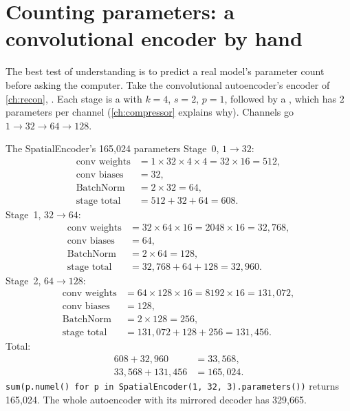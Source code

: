 \section{Counting parameters: a convolutional encoder by hand}\label{sec:shapes:count}

The best test of understanding is to predict a real model's parameter count before asking the
computer. Take the convolutional autoencoder's encoder of \cref{ch:recon},
. Each stage is a
 with $k=4$, $s=2$, $p=1$, followed by a , which has $2$ parameters per
channel (\cref{ch:compressor} explains why). Channels go $1\to32\to64\to128$.

\begin{worked}[label={we:shapes:spatialcount}]{The SpatialEncoder's 165,024 parameters}
Stage~0, $1\to32$:
\begin{align*}
\text{conv weights} &= 1\times32\times4\times4 = 32\times16 = 512,\\
\text{conv biases} &= 32,\\
\text{BatchNorm} &= 2\times32 = 64,\\
\text{stage total} &= 512 + 32 + 64 = 608.
\end{align*}
Stage~1, $32\to64$:
\begin{align*}
\text{conv weights} &= 32\times64\times16 = 2048\times16 = 32{,}768,\\
\text{conv biases} &= 64,\\
\text{BatchNorm} &= 2\times64 = 128,\\
\text{stage total} &= 32{,}768 + 64 + 128 = 32{,}960.
\end{align*}
Stage~2, $64\to128$:
\begin{align*}
\text{conv weights} &= 64\times128\times16 = 8192\times16 = 131{,}072,\\
\text{conv biases} &= 128,\\
\text{BatchNorm} &= 2\times128 = 256,\\
\text{stage total} &= 131{,}072 + 128 + 256 = 131{,}456.
\end{align*}
Total:
\begin{align*}
608 + 32{,}960 &= 33{,}568,\\
33{,}568 + 131{,}456 &= 165{,}024.
\end{align*}
\lstinline!sum(p.numel() for p in SpatialEncoder(1, 32, 3).parameters())! returns
165{,}024\tagC. The whole autoencoder with its mirrored decoder has
329{,}665.
\end{worked}

